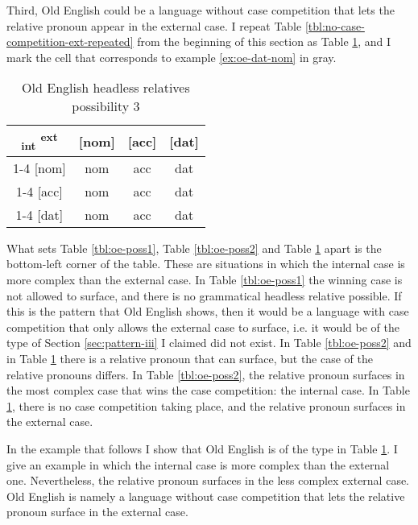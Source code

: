 Third, Old English could be a language without case competition that lets the relative pronoun appear in the external case. I repeat Table \ref{tbl:no-case-competition-ext-repeated} from the beginning of this section as Table \ref{tbl:oe-poss3}, and I mark the cell that corresponds to example \ref{ex:oe-dat-nom} in gray.

 \begin{table}[ht]
   \center
   \caption{Old English headless relatives possibility 3}
   \begin{tabular}{c|c|c|c}
     \toprule
    \textsubscript{\ac{int}} \textsuperscript{\ac{ext}}
           & [\ac{nom}]
           & [\ac{acc}]
           & [\ac{dat}]
           \\ \cmidrule{1-4}
       [\ac{nom}]
           & \ac{nom}
           & \ac{acc}
           & \cellcolor{LG}\ac{dat}
           \\ \cmidrule{1-4}
       [\ac{acc}]
           & \ac{nom}
           & \ac{acc}
           & \ac{dat}
           \\ \cmidrule{1-4}
       [\ac{dat}]
           & \ac{nom}
           & \ac{acc}
           & \ac{dat}
           \\
     \bottomrule
   \end{tabular}
   \label{tbl:oe-poss3}
 \end{table}

What sets Table \ref{tbl:oe-poss1}, Table \ref{tbl:oe-poss2} and Table \ref{tbl:oe-poss3} apart is the bottom-left corner of the table. These are situations in which the internal case is more complex than the external case.
In Table \ref{tbl:oe-poss1} the winning case is not allowed to surface, and there is no grammatical headless relative possible. If this is the pattern that Old English shows, then it would be a language with case competition that only allows the external case to surface, i.e. it would be of the type of Section \ref{sec:pattern-iii} I claimed did not exist.
In Table \ref{tbl:oe-poss2} and in Table \ref{tbl:oe-poss3} there is a relative pronoun that can surface, but the case of the relative pronouns differs. In Table \ref{tbl:oe-poss2}, the relative pronoun surfaces in the most complex case that wins the case competition: the internal case. In Table \ref{tbl:oe-poss3}, there is no case competition taking place, and the relative pronoun surfaces in the external case.

In the example that follows I show that Old English is of the type in Table \ref{tbl:oe-poss3}. I give an example in which the internal case is more complex than the external one. Nevertheless, the relative pronoun surfaces in the less complex external case. Old English is namely a language without case competition that lets the relative pronoun surface in the external case.

